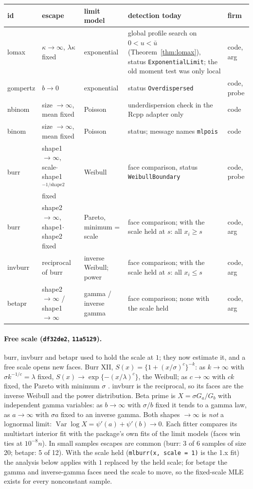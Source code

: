 \documentclass[11pt]{article}
\newcommand{\code}[1]{\texttt{#1}}
\theoremstyle{plain}
\theoremstyle{definition}
\theoremstyle{remark}
\begin{document}
\begin{center}
\small
\begin{tabular}{@{}l p{4.0cm} p{2.6cm} p{4.4cm} l@{}}
\toprule
id & escape & limit model & detection today & firm \\
\midrule
lomax & $\kappa\to\infty$, $\lambda\kappa$ fixed & exponential \cite{kk2003} &
  global profile search on $0<u<\bar u$ (Theorem~\ref{thm:lomax}), status
  \code{ExponentialLimit}; the old moment test was only local & code, arg \\
gompertz & $b \to 0$ & exponential & status \code{Overdispersed} & code, probe \\
nbinom & size $\to\infty$, mean fixed & Poisson &
  underdispersion check in the Rcpp adapter only & code \\
binom & size $\to\infty$, mean fixed & Poisson & status; message names \code{mlpois} & code \\
burr & shape1 $\to\infty$, scale$\cdot$shape1$^{-1/\text{shape2}}$ fixed & Weibull &
  face comparison, status \code{WeibullBoundary} & code, probe \\
burr & shape2 $\to\infty$, shape1$\cdot$shape2 fixed & Pareto, minimum = scale &
  face comparison; with the scale held at $s$: all $x_i \ge s$ & code, arg \\
invburr & reciprocal of burr & inverse Weibull; power &
  face comparison; with the scale held at $s$: all $x_i \le s$ & code, arg \\
betapr & shape2 $\to\infty$ / shape1 $\to\infty$ & gamma / inverse gamma &
  face comparison; none with the scale held & code, arg \\
\bottomrule
\end{tabular}
\end{center}

\paragraph{Free scale (\code{df32de2}, \code{11a5129}).} burr, invburr and
betapr used to hold the scale at $1$; they now estimate it, and a free scale
opens new faces. Burr XII, $S(x) = \{1 + (x/\sigma)^c\}^{-k}$: as
$k\to\infty$ with $\sigma k^{-1/c} = \lambda$ fixed,
$S(x) \to \exp\{-(x/\lambda)^c\}$, the Weibull; as $c\to\infty$ with $ck$
fixed, the Pareto with minimum $\sigma$ \cite{shao2004}. invburr is the
reciprocal, so its faces are the inverse Weibull and the power distribution.
Beta prime is $X = \sigma G_a/G_b$ with independent gamma variables: as
$b\to\infty$ with $\sigma/b$ fixed it tends to a gamma law, as $a\to\infty$
with $\sigma a$ fixed to an inverse gamma. Both shapes $\to\infty$ is
\emph{not} a lognormal limit: $\operatorname{Var}\log X = \psi'(a) + \psi'(b)
\to 0$. Each fitter compares its multistart interior fit with the package's
own fits of the limit models (faces win ties at $10^{-8}n$). In small
samples escapes are common (burr: 3 of 6 samples of size 20; betapr: 5 of
12). With the scale held (\code{mlburr(x, scale = 1)} is the 1.x fit) the
analysis below applies with $1$ replaced by the held scale; for betapr the
gamma and inverse-gamma faces need the scale to move, so the fixed-scale
MLE exists for every nonconstant sample.
\end{document}
